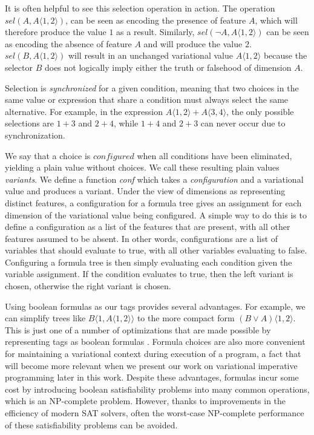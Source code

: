 \documentclass[letterpaper,10pt,onecolumn]{article}
\newcommand{\tagtree}[3]{#1 \langle #2, #3 \rangle}
\begin{document}
It is often helpful to see this selection operation in action. The operation
$\mathit{sel}(A,\tagtree{A}{1}{2})$, can be seen as encoding the presence of feature $A$, which
will therefore produce the value $1$ as a result. Similarly, $\mathit{sel}(\neg A,\tagtree{A}{1}{2})$ can be seen as encoding the absence of feature $A$ and will
produce the value $2$. $\mathit{sel}(B,\tagtree{A}{1}{2})$ will result in an unchanged variational
value $\tagtree{A}{1}{2}$ because the selector $B$ does not logically imply either the truth or falsehood
of dimension $A$.

Selection is \emph{synchronized} for a given
condition, meaning that two choices in the same value or expression that share a condition must always
select the same alternative. For example, in the expression $\tagtree{A}{1}{2}+\tagtree{A}{3}{4}$,
the only possible selections are $1+3$ and $2+4$, while $1+4$ and $2+3$ can never occur due
to synchronization.

We say that a choice is $configured$ when all conditions
have been eliminated, yielding a plain value without choices. We call these resulting plain values
\emph{variants}. We define a function \emph{conf} which takes a
\emph{configuration} and a variational value and produces a variant. Under the view of dimensions as representing distinct features, a configuration for a formula tree gives
an assignment for each dimension of the variational value being configured.
A simple way to do this is to define a configuration as a list of the features that are present, with all
other features assumed to be absent. In other words, configurations are a list of variables that should
evaluate to true, with all other variables evaluating to false. Configuring a formula tree is then simply evaluating
each condition given the variable assignment. If the condition evaluates to true, then the left variant
is chosen, otherwise the right variant is chosen.

Using boolean formulas as our tags provides several advantages. For example, we can simplify trees like
$\tagtree{B}{1}{\tagtree{A}{1}{2}}$ to the more compact form $\tagtree{(B \vee A)}{1}{2}$. This is just
one of a number of optimizations that are made possible by representing tags as boolean formulas
\cite{walkingshaw2014projectional,hubbard2016formula}. Formula choices are also more convenient
for maintaining a variational context during execution of a program, a fact that will become
more relevant when we present our work on variational imperative programming later in
this work. Despite these advantages, formulas incur some cost by introducing boolean
satisfiability problems into many common operations, which is an NP-complete problem. However, thanks to improvements in the
efficiency of modern SAT solvers, often the worst-case NP-complete performance of these satisfiability
problems can be avoided.
\end{document}
